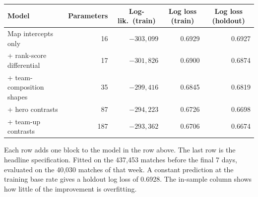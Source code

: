 \documentclass[11pt]{article}
\begin{document}
\vspace{6pt}
\begin{center}\small
\begin{threeparttable}
\label{tab:ladder}
\begin{tabular}{l r r r r}
\toprule
Model & \multicolumn{1}{c}{Parameters} & \multicolumn{1}{c}{Log-lik.\ (train)} &
\multicolumn{1}{c}{Log loss (train)} & \multicolumn{1}{c}{Log loss (holdout)} \\
\midrule
Map intercepts only & 16 & $-303{,}099$ & 0.6929 & 0.6927 \\
+ rank-score differential & 17 & $-301{,}826$ & 0.6900 & 0.6874 \\
+ team-composition shapes & 35 & $-299{,}416$ & 0.6845 & 0.6819 \\
+ hero contrasts & 87 & $-294{,}223$ & 0.6726 & 0.6698 \\
+ team-up contrasts & 187 & $-293{,}362$ & 0.6706 & 0.6674 \\
\bottomrule
\end{tabular}
\begin{tablenotes}[flushleft]\footnotesize
\item Each row adds one block to the model in the row above. The last row is the
headline specification. Fitted on the 437,453 matches before the final
7 days, evaluated on the 40,030 matches of that week. A constant
prediction at the training base rate gives a holdout log loss of 0.6928. The
in-sample column shows how little of the improvement is overfitting.
\end{tablenotes}
\end{threeparttable}
\end{center}
\end{document}

